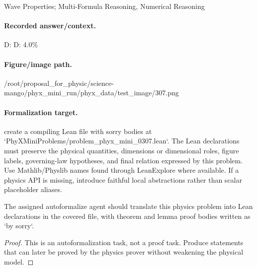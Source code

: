 Wave Properties; Multi-Formula Reasoning, Numerical Reasoning

\paragraph{Recorded answer/context.}
D: D: 4.0\%

\paragraph{Figure/image path.}
/root/proposal\_for\_physic/science-mango/phyx\_mini\_run/phyx\_data/test\_image/307.png

\paragraph{Formalization target.}
create a compiling Lean file with sorry bodies at `PhyXMiniProblems/problem\_phyx\_mini\_0307.lean`. The Lean declarations must preserve the physical quantities, dimensions or dimensional roles, figure labels, governing-law hypotheses, and final relation expressed by this problem.
Use Mathlib/Physlib names found through LeanExplore where available. If a physics API is missing, introduce faithful local abstractions rather than scalar placeholder aliases.

\begin{theorem}
\label{thm:physics:phyx_mini_0307:target}
The assigned autoformalize agent should translate this physics problem into Lean declarations in the covered file, with theorem and lemma proof bodies written as `by sorry`.
\end{theorem}
\begin{proof}
This is an autoformalization task, not a proof task. Produce statements that can later be proved by the physics prover without weakening the physical model.
\end{proof}

